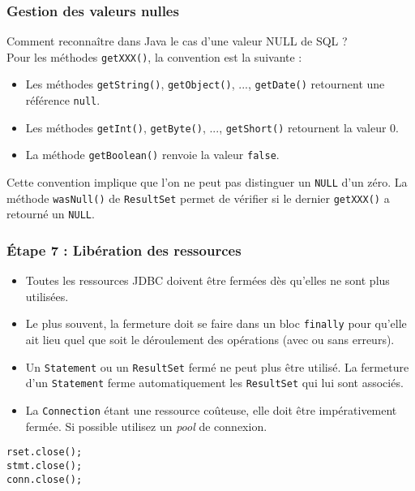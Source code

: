 \documentclass[xcolor=pdftex,x11names,table]{beamer}
\begin{document}
    \begin{frame}
    \frametitle{Gestion des valeurs nulles}
			Comment reconnaître dans Java le cas d’une valeur NULL de SQL ? \\
			Pour les méthodes \lstinline$getXXX()$, la convention est la suivante :
    	\begin{itemize}
    		\item Les méthodes \lstinline$getString()$, \lstinline$getObject()$, ..., \lstinline$getDate()$ retournent une référence \lstinline$null$.
				\item Les méthodes \lstinline$getInt()$, \lstinline$getByte()$, ..., \lstinline$getShort()$ retournent la valeur $0$.
				\item La méthode \lstinline$getBoolean()$ renvoie la valeur \lstinline$false$.
  		\end{itemize}
  		Cette convention implique que l'on ne peut pas distinguer un \texttt{NULL} d'un zéro.
  		La méthode \lstinline$wasNull()$ de \lstinline$ResultSet$ permet de vérifier si le dernier \lstinline$getXXX()$ 
  		a retourné un \texttt{NULL}.
    \end{frame}
    
    \begin{frame}
    \frametitle{Étape 7 : Libération des ressources}
    	\begin{itemize}
    		\item Toutes les ressources JDBC doivent être fermées dès qu’elles ne sont plus utilisées.
    		\item Le plus souvent, la fermeture doit se faire dans un bloc \lstinline$finally$ pour qu’elle ait 
    		lieu quel que soit le déroulement des opérations (avec ou sans erreurs).
				\item Un \lstinline$Statement$ ou un \lstinline$ResultSet$ fermé ne peut plus être utilisé. La fermeture d'un 
				\lstinline$Statement$ ferme automatiquement les \lstinline$ResultSet$ qui lui sont associés.
				\item La \lstinline$Connection$ étant une ressource coûteuse, elle doit être impérativement fermée. 
				Si possible utilisez un \emph{pool} de connexion.
			\end{itemize}
			\begin{block}{}
				\lstinline$rset.close();$\\
				\lstinline$stmt.close();$\\
				\lstinline$conn.close();$
      \end{block}
    \end{frame}
\end{document}
